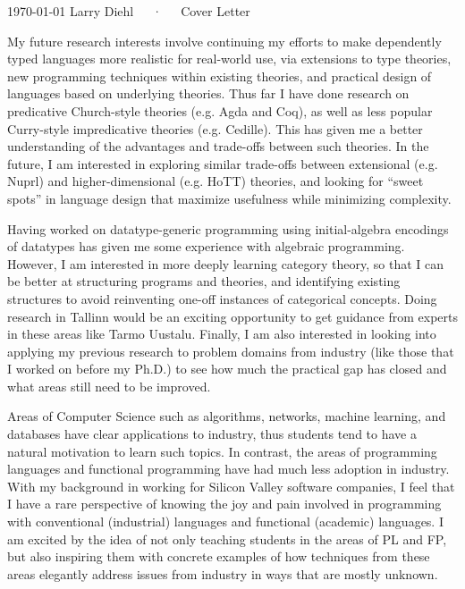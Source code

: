 \documentclass[11pt, a4paper]{awesome-cv}
\begin{document}
\makecvheader

\makecvfooter
  {\today}
  {Larry Diehl~~~·~~~Cover Letter}
  {}

\makelettertitle

\begin{cvletter}


My future research interests involve continuing my efforts to make
dependently typed languages more realistic for real-world use, via
extensions to type theories, new programming techniques within
existing theories, and practical design of languages based on
underlying theories. Thus far I have done research on predicative
Church-style theories (e.g. Agda and Coq), as well as less popular
Curry-style impredicative theories (e.g. Cedille). This has given me a
better understanding of the advantages and trade-offs between such
theories. In the future, I am interested in exploring similar
trade-offs between extensional (e.g. Nuprl) and higher-dimensional
(e.g. HoTT) theories, and looking for ``sweet spots'' in language
design that maximize usefulness while minimizing complexity.

Having worked on datatype-generic programming using initial-algebra
encodings of datatypes has given me some experience with algebraic
programming. However, I am interested in more deeply learning category
theory, so that I can be better at structuring programs and theories,
and identifying existing structures to avoid reinventing one-off
instances of categorical concepts. Doing research in Tallinn would be
an exciting opportunity to get guidance from experts in these areas
like Tarmo Uustalu. Finally, I am also interested in looking into
applying my previous research to problem domains from industry (like
those that I worked on before my Ph.D.) to see how much the practical
gap has closed and what areas still need to be improved.


Areas of Computer Science such as algorithms, networks, machine
learning, and databases have clear applications to industry, thus
students tend to have a natural motivation to learn such topics.
In contrast, the areas of programming languages and functional
programming have had much less adoption in industry. With my
background in working for Silicon Valley software companies, I feel
that I have a rare perspective of knowing the joy and pain involved in
programming with conventional (industrial) languages and functional
(academic) languages. I am excited by the idea of not only teaching
students in the areas of PL and FP, but also inspiring them with
concrete examples of how techniques from these areas elegantly address
issues from industry in ways that are mostly unknown.

\end{cvletter}


\makeletterclosing
\end{document}
